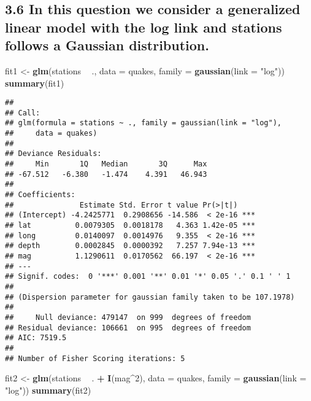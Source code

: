 \documentclass[
]{article}
\newenvironment{Shaded}{\begin{snugshade}}{\end{snugshade}}
\newcommand{\DataTypeTok}[1]{\textcolor[rgb]{0.13,0.29,0.53}{#1}}
\newcommand{\DecValTok}[1]{\textcolor[rgb]{0.00,0.00,0.81}{#1}}
\newcommand{\KeywordTok}[1]{\textcolor[rgb]{0.13,0.29,0.53}{\textbf{#1}}}
\newcommand{\NormalTok}[1]{#1}
\newcommand{\OperatorTok}[1]{\textcolor[rgb]{0.81,0.36,0.00}{\textbf{#1}}}
\newcommand{\StringTok}[1]{\textcolor[rgb]{0.31,0.60,0.02}{#1}}
\begin{document}
\hypertarget{in-this-question-we-consider-a-generalized-linear-model-with-the-log-link-and-stations-follows-a-gaussian-distribution.}{%
\subsection{3.6 In this question we consider a generalized linear model
with the log link and stations follows a Gaussian
distribution.}\label{in-this-question-we-consider-a-generalized-linear-model-with-the-log-link-and-stations-follows-a-gaussian-distribution.}}

\begin{Shaded}
\begin{Highlighting}[]
\NormalTok{fit1 <-}\StringTok{ }\KeywordTok{glm}\NormalTok{(stations }\OperatorTok{~}\StringTok{ }\NormalTok{., }\DataTypeTok{data =}\NormalTok{ quakes, }\DataTypeTok{family =} \KeywordTok{gaussian}\NormalTok{(}\DataTypeTok{link =} \StringTok{"log"}\NormalTok{))}
\KeywordTok{summary}\NormalTok{(fit1)}
\end{Highlighting}
\end{Shaded}

\begin{verbatim}
## 
## Call:
## glm(formula = stations ~ ., family = gaussian(link = "log"), 
##     data = quakes)
## 
## Deviance Residuals: 
##     Min       1Q   Median       3Q      Max  
## -67.512   -6.380   -1.474    4.391   46.943  
## 
## Coefficients:
##               Estimate Std. Error t value Pr(>|t|)    
## (Intercept) -4.2425771  0.2908656 -14.586  < 2e-16 ***
## lat          0.0079305  0.0018178   4.363 1.42e-05 ***
## long         0.0140097  0.0014976   9.355  < 2e-16 ***
## depth        0.0002845  0.0000392   7.257 7.94e-13 ***
## mag          1.1290611  0.0170562  66.197  < 2e-16 ***
## ---
## Signif. codes:  0 '***' 0.001 '**' 0.01 '*' 0.05 '.' 0.1 ' ' 1
## 
## (Dispersion parameter for gaussian family taken to be 107.1978)
## 
##     Null deviance: 479147  on 999  degrees of freedom
## Residual deviance: 106661  on 995  degrees of freedom
## AIC: 7519.5
## 
## Number of Fisher Scoring iterations: 5
\end{verbatim}

\begin{Shaded}
\begin{Highlighting}[]
\NormalTok{fit2 <-}\StringTok{ }\KeywordTok{glm}\NormalTok{(stations }\OperatorTok{~}\StringTok{ }\NormalTok{. }\OperatorTok{+}\StringTok{ }\KeywordTok{I}\NormalTok{(mag}\OperatorTok{^}\DecValTok{2}\NormalTok{), }\DataTypeTok{data =}\NormalTok{ quakes, }\DataTypeTok{family =} \KeywordTok{gaussian}\NormalTok{(}\DataTypeTok{link =} \StringTok{"log"}\NormalTok{))}
\KeywordTok{summary}\NormalTok{(fit2)}
\end{Highlighting}
\end{Shaded}
\end{document}
